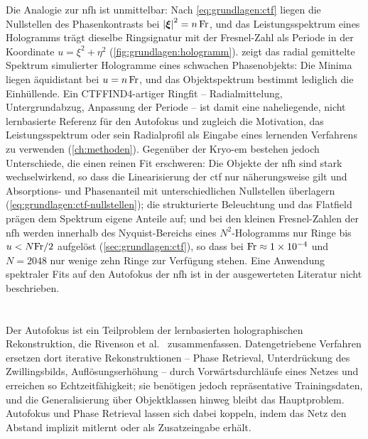 Die Analogie zur \ac{nfh} ist unmittelbar: Nach \cref{eq:grundlagen:ctf}
liegen die Nullstellen des Phasenkontrasts bei $\left\lvert \bm{\xi} \right\rvert^2 = n\,\mathrm{Fr}$,
und das Leistungsspektrum eines Hologramms trägt dieselbe Ringsignatur mit
der Fresnel-Zahl als Periode in der Koordinate $u = \xi^2 + \eta^2$
(\cref{fig:grundlagen:hologramm}).  zeigt das
radial gemittelte Spektrum simulierter Hologramme eines schwachen
Phasenobjekts: Die Minima liegen äquidistant bei $u = n\,\mathrm{Fr}$, und das
Objektspektrum bestimmt lediglich die Einhüllende. Ein
\textsc{CTFFIND4}-artiger Ringfit -- Radialmittelung, Untergrundabzug,
Anpassung der Periode -- ist damit eine naheliegende, nicht lernbasierte
Referenz für den Autofokus und zugleich die Motivation, das
Leistungsspektrum oder sein Radialprofil als Eingabe eines lernenden
Verfahrens zu verwenden (\cref{ch:methoden}). Gegenüber der Kryo-\ac{em}
bestehen jedoch Unterschiede, die einen reinen Fit erschweren: Die Objekte
der \ac{nfh} sind stark wechselwirkend, so dass die Linearisierung der
\ac{ctf} nur näherungsweise gilt und Absorptions- und Phasenanteil mit
unterschiedlichen Nullstellen überlagern (\cref{eq:grundlagen:ctf-nullstellen});
die strukturierte Beleuchtung und das Flatfield prägen dem Spektrum eigene
Anteile auf; und bei den kleinen Fresnel-Zahlen der \ac{nfh} werden
innerhalb des Nyquist-Bereichs eines $N^2$-Hologramms nur Ringe bis
$u < N\mathrm{Fr}/2$ aufgelöst (\cref{sec:grundlagen:ctf}), so dass bei
$\mathrm{Fr} \approx \num{1e-4}$ und $N = 2048$ nur wenige zehn Ringe zur
Verfügung stehen. Eine Anwendung spektraler Fits auf den Autofokus der
\ac{nfh} ist in der ausgewerteten Literatur nicht beschrieben.

\section{}
\label{sec:stand:dl-pr}

Der Autofokus ist ein Teilproblem der lernbasierten holographischen
Rekonstruktion, die Rivenson et al.\ \cite{rivenson2019deep} zusammenfassen. Datengetriebene
Verfahren ersetzen dort iterative Rekonstruktionen -- Phase Retrieval,
Unterdrückung des Zwillingsbilds, Auflösungserhöhung -- durch
Vorwärtsdurchläufe eines Netzes und erreichen so Echtzeitfähigkeit; sie
benötigen jedoch repräsentative Trainingsdaten, und die Generalisierung
über Objektklassen hinweg bleibt das Hauptproblem. Autofokus und Phase
Retrieval lassen sich dabei koppeln, indem das Netz den Abstand implizit
mitlernt oder als Zusatzeingabe erhält.

